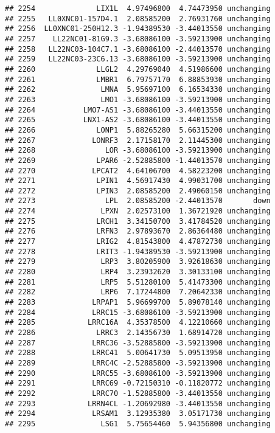 \documentclass[]{article}
\begin{document}
\begin{verbatim}
## 2254              LIX1L  4.97496800  4.74473950 unchanging
## 2255   LL0XNC01-157D4.1  2.08585200  2.76931760 unchanging
## 2256  LL0XNC01-250H12.3 -1.94389530 -3.44013550 unchanging
## 2257    LL22NC01-81G9.3 -3.68086100 -3.59213900 unchanging
## 2258   LL22NC03-104C7.1 -3.68086100 -2.44013570 unchanging
## 2259   LL22NC03-23C6.13 -3.68086100 -3.59213900 unchanging
## 2260              LLGL2  4.29769040  4.51986600 unchanging
## 2261              LMBR1  6.79757170  6.88853930 unchanging
## 2262               LMNA  5.95697100  6.16534330 unchanging
## 2263               LMO1 -3.68086100 -3.59213900 unchanging
## 2264           LMO7-AS1 -3.68086100 -3.44013550 unchanging
## 2265           LNX1-AS2 -3.68086100 -3.44013550 unchanging
## 2266              LONP1  5.88265280  5.66315200 unchanging
## 2267             LONRF3  2.17158170  2.11445300 unchanging
## 2268                LOR -3.68086100 -3.59213900 unchanging
## 2269              LPAR6 -2.52885800 -1.44013570 unchanging
## 2270             LPCAT2  4.64106700  4.58223200 unchanging
## 2271              LPIN1  4.56917430  4.99031700 unchanging
## 2272              LPIN3  2.08585200  2.49060150 unchanging
## 2273                LPL  2.08585200 -2.44013570       down
## 2274               LPXN  2.02573100  1.36721920 unchanging
## 2275              LRCH1  3.34150700  3.41784520 unchanging
## 2276              LRFN3  2.97893670  2.86364480 unchanging
## 2277              LRIG2  4.81543800  4.47872730 unchanging
## 2278              LRIT3 -1.94389530 -3.59213900 unchanging
## 2279               LRP3  3.80205900  3.92618630 unchanging
## 2280               LRP4  3.23932620  3.30133100 unchanging
## 2281               LRP5  5.51280100  5.41473300 unchanging
## 2282               LRP6  7.17244800  7.20642330 unchanging
## 2283             LRPAP1  5.96699700  5.89078140 unchanging
## 2284             LRRC15 -3.68086100 -3.59213900 unchanging
## 2285            LRRC16A  4.35378500  4.12210660 unchanging
## 2286              LRRC3  2.14356730  1.68914720 unchanging
## 2287             LRRC36 -3.52885800 -3.59213900 unchanging
## 2288             LRRC41  5.00641730  5.09513950 unchanging
## 2289             LRRC4C -2.52885800 -3.59213900 unchanging
## 2290             LRRC55 -3.68086100 -3.59213900 unchanging
## 2291             LRRC69 -0.72150310 -0.11820772 unchanging
## 2292             LRRC70 -1.52885800 -3.44013550 unchanging
## 2293            LRRN4CL -1.20692980 -3.44013550 unchanging
## 2294             LRSAM1  3.12935380  3.05171730 unchanging
## 2295               LSG1  5.75654460  5.94356800 unchanging

\end{verbatim}
\end{document}
